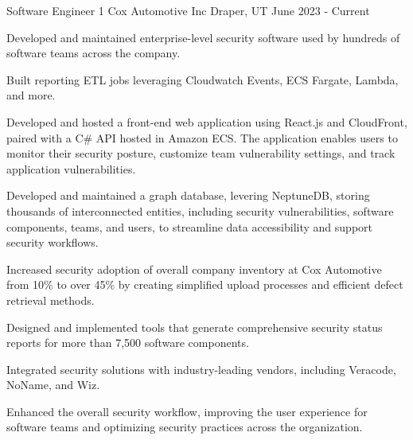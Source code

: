 


\begin{cventries}


\cventry
{Software Engineer 1} %
{Cox Automotive Inc} %
{Draper, UT} %
{June 2023 - Current} %
{ %
\begin{cvitems}
\item {Developed and maintained enterprise-level security software used by hundreds of software teams across the company.}
\item {Built reporting ETL jobs leveraging Cloudwatch Events, ECS Fargate, Lambda, and more.}
\item {Developed and hosted a front-end web application using React.js and CloudFront, paired with a C\# API hosted in Amazon ECS. The application enables users to monitor their security posture, customize team vulnerability settings, and track application vulnerabilities.}
\item {Developed and maintained a graph database, levering NeptuneDB, storing thousands of interconnected entities, including security vulnerabilities, software components, teams, and users, to streamline data accessibility and support security workflows.}
\item {Increased security adoption of overall company inventory at Cox Automotive from 10\% to over 45\% by creating simplified upload processes and efficient defect retrieval methods.}
\item {Designed and implemented tools that generate comprehensive security status reports for more than 7,500 software components.}
\item {Integrated security solutions with industry-leading vendors, including Veracode, NoName, and Wiz.}
\item {Enhanced the overall security workflow, improving the user experience for software teams and optimizing security practices across the organization.}
\end{cvitems}
}


\end{cventries}
